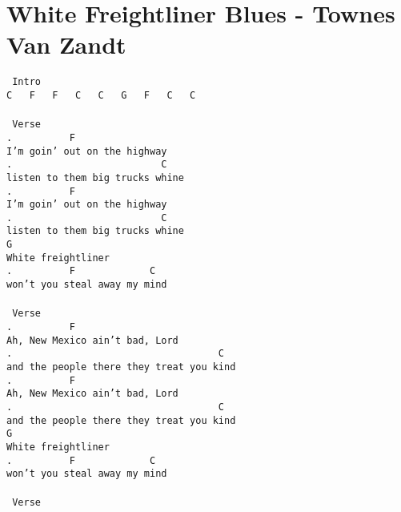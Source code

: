 \newpage
\section{White Freightliner Blues - Townes Van Zandt}
\label{White Freightliner Blues - Townes Van Zandt}
\texttt{\lbrack\ Intro\rbrack\\
C\ \ \ F\ \ \ F\ \ \ C\ \ \ C\ \ \ G\ \ \ F\ \ \ C\ \ \ C\\
\\
\lbrack\ Verse\rbrack\\
.\ \ \ \ \ \ \ \ \ \ F\\
I'm\ goin'\ out\ on\ the\ highway\\
.\ \ \ \ \ \ \ \ \ \ \ \ \ \ \ \ \ \ \ \ \ \ \ \ \ \ C\\
listen\ to\ them\ big\ trucks\ whine\\
.\ \ \ \ \ \ \ \ \ \ F\\
I'm\ goin'\ out\ on\ the\ highway\\
.\ \ \ \ \ \ \ \ \ \ \ \ \ \ \ \ \ \ \ \ \ \ \ \ \ \ C\\
listen\ to\ them\ big\ trucks\ whine\\
G\\
White\ freightliner\\
.\ \ \ \ \ \ \ \ \ \ F\ \ \ \ \ \ \ \ \ \ \ \ \ C\\
won't\ you\ steal\ away\ my\ mind\\
\\
\lbrack\ Verse\rbrack\\
.\ \ \ \ \ \ \ \ \ \ F\\
Ah,\ New\ Mexico\ ain't\ bad,\ Lord\\
.\ \ \ \ \ \ \ \ \ \ \ \ \ \ \ \ \ \ \ \ \ \ \ \ \ \ \ \ \ \ \ \ \ \ \ \ C\\
and\ the\ people\ there\ they\ treat\ you\ kind\\
.\ \ \ \ \ \ \ \ \ \ F\\
Ah,\ New\ Mexico\ ain't\ bad,\ Lord\\
.\ \ \ \ \ \ \ \ \ \ \ \ \ \ \ \ \ \ \ \ \ \ \ \ \ \ \ \ \ \ \ \ \ \ \ \ C\\
and\ the\ people\ there\ they\ treat\ you\ kind\\
G\\
White\ freightliner\\
.\ \ \ \ \ \ \ \ \ \ F\ \ \ \ \ \ \ \ \ \ \ \ \ C\\
won't\ you\ steal\ away\ my\ mind\\
\\
\lbrack\ Verse\rbrack\\
}
